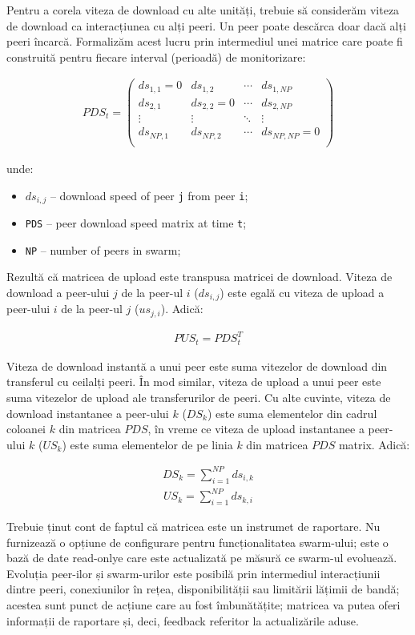 Pentru a corela viteza de download cu alte unități, trebuie să considerăm
viteza de download ca interacțiunea cu alți peeri. Un peer poate descărca doar
dacă alți peeri încarcă. Formalizăm acest lucru prin intermediul unei matrice
care poate fi construită pentru fiecare interval (perioadă) de monitorizare:

\begin{align}
  PDS_{t} =
  \begin{pmatrix}
    ds_{1,1} = 0 & ds_{1,2} & \cdots & ds_{1,NP} \\
    ds_{2,1} & ds_{2,2} = 0 & \cdots & ds_{2,NP} \\
    \vdots & \vdots & \ddots & \vdots \\
    ds_{NP,1} & ds_{NP,2} & \cdots & ds_{NP,NP} = 0 \\
  \end{pmatrix}
\end{align}

unde:

\begin{itemize}
  \item $ds_{i,j}$ -- download speed of peer \texttt{j} from peer \texttt{i};
  \item \texttt{PDS} -- peer download speed matrix at time \texttt{t};
  \item \texttt{NP} -- number of peers in swarm;
\end{itemize}

Rezultă că matricea de upload este transpusa matricei de download. Viteza de
download a peer-ului $j$ de la peer-ul $i$ ($ds_{i,j}$) este egală cu viteza
de upload a peer-ului $i$ de la peer-ul $j$ ($us_{j,i}$). Adică:

\begin{align}
  PUS_{t} = PDS_{t}^{T}
\end{align}

Viteza de download instantă a unui peer este suma vitezelor de download din
transferul cu ceilalți peeri. În mod similar, viteza de upload a unui peer
este suma vitezelor de upload ale transferurilor de peeri. Cu alte cuvinte,
viteza de download instantanee a peer-ului $k$ ($DS_{k}$) este suma elementelor
din cadrul coloanei $k$ din matricea $PDS$, în vreme ce viteza de upload
instantanee a peer-ului $k$ ($US_{k}$) este suma elementelor de pe linia $k$
din matricea $PDS$ matrix. Adică:

\begin{align}
  DS_{k} = \sum_{i=1}^{NP} ds_{i,k}
\end{align}
\begin{align}
  US_{k} = \sum_{i=1}^{NP} ds_{k,i}
\end{align}

Trebuie ținut cont de faptul că matricea este un instrumet de raportare. Nu
furnizează o opțiune de configurare pentru funcționalitatea swarm-ului; este o
bază de date read-onlye care este actualizată pe măsură ce swarm-ul evoluează.
Evoluția peer-ilor și swarm-urilor este posibilă prin intermediul
interacțiunii dintre peeri, conexiunilor în rețea, disponibilității sau
limitării lățimii de bandă; acestea sunt punct de acțiune care au fost
îmbunătățite; matricea va putea oferi informații de raportare și, deci,
feedback referitor la actualizările aduse.
